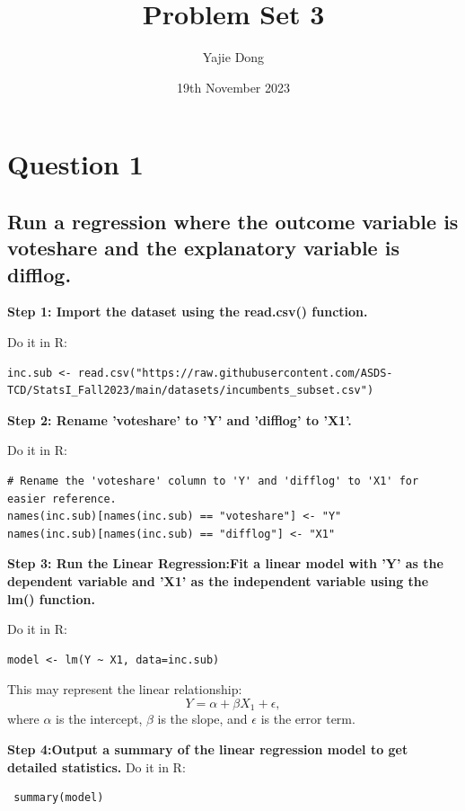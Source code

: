 \documentclass[12pt]{article}
\title{Problem Set 3}
\author{Yajie Dong}
\date{19th November 2023}
\begin{document}
\maketitle

\section{Question 1}
\subsection{Run a regression where the outcome variable is voteshare and the explanatory variable is difflog.}

\textbf{Step 1: Import the dataset using the read.csv() function.}

Do it in R:
\begin{lstlisting}
inc.sub <- read.csv("https://raw.githubusercontent.com/ASDS-TCD/StatsI_Fall2023/main/datasets/incumbents_subset.csv")
\end{lstlisting}

\textbf{Step 2: Rename 'voteshare' to 'Y' and 'difflog' to 'X1'. }

Do it in R:
\begin{lstlisting}
# Rename the 'voteshare' column to 'Y' and 'difflog' to 'X1' for easier reference.
names(inc.sub)[names(inc.sub) == "voteshare"] <- "Y"
names(inc.sub)[names(inc.sub) == "difflog"] <- "X1"
\end{lstlisting}


\textbf{Step 3: Run the Linear Regression:Fit a linear model with 'Y' as the dependent variable and 'X1' as the independent variable using the lm() function.}

Do it in R:

\lstset{style=mystyle}
\begin{lstlisting}
model <- lm(Y ~ X1, data=inc.sub)
\end{lstlisting}
This may represent the linear relationship:
\begin{equation}
    Y = \alpha + \beta X_1 + \epsilon,
\end{equation}
where \( \alpha \) is the intercept, \( \beta \) is the slope, and \( \epsilon \) is the error term.

\textbf{Step 4:Output a summary of the linear regression model to get detailed statistics.} Do it in R:
 \lstset{style=mystyle}
\begin{lstlisting}
 summary(model)
\end{lstlisting}
\end{document}
